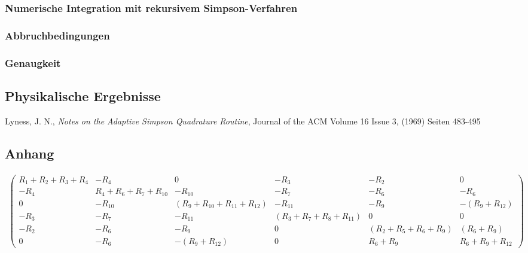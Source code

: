 \documentclass[10pt,a4paper]{article}
\begin{document}
\subsubsection{Numerische Integration mit rekursivem Simpson-Verfahren}


\subsubsection{Abbruchbedingungen}

\subsubsection{Genaugkeit}

\subsection{Physikalische Ergebnisse}
\begin{thebibliography}{9}

 Lyness, J. N.,
 \emph{Notes on the Adaptive Simpson Quadrature Routine},
Journal of the ACM
Volume 16 Issue 3, (1969) 
Seiten 483-495 

\end{thebibliography}
\begin{landscape}
\thispagestyle{empty}
\appendix
\section{Anhang}
\begin{align}
\begin{pmatrix}
R_1+R_2+R_3+R_4 &  -R_4  &  0  &  -R_3  &  -R_2  &  0  \\ 
-R_4 & R_4+R_6+R_7+R_{10} & -R_{10} & -R_7 & -R_6 & -R_6 \\ 
 0  & -R_{10} & (R_9+R_{10}+R_{11}+R_{12}) & -R_{11} & -R_9 & -(R_9+R_{12}) \\ 
-R_3 & -R_7 & -R_11 & (R_3+R_7+R_8+R_{11}) & 0 & 0 \\ 
-R_2 & -R_6 & -R_9 & 0 & (R_2+R_5+R_6+R_9) & (R_6+R_9) \\ 
 0  & -R_6 & -(R_9+R_{12}) &  0  & R_6+R_9 & R_6+R_9+R_{12}
\end{pmatrix}
\end{align}
\end{landscape}
\end{document}
